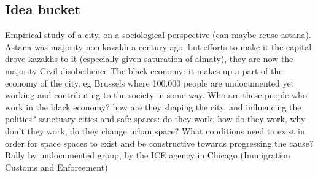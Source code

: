 \documentclass{article}
\begin{document}
\subsection{Idea bucket}

\begin{outline}
	\1 Empirical study of a city, on a sociological perspective (can maybe reuse astana). Astana was majority non-kazakh a century ago, but efforts to make it the capital drove kazakhs to it (especially given saturation of almaty), they are now the majority
	\1 Civil disobedience 
	\1 The black economy: it makes up a part of the economy of the city, eg Brussels where 100.000 people are undocumented yet working and contributing to the society in some way. Who are these people who work in the black economy? how are they shaping the city, and influencing the politics?
	\1 sanctuary cities and safe spaces: do they work, how do they work, why don't they work, do they change urban space?
		\2 What conditions need to exist in order for space spaces to exist and be constructive towards progressing the cause?
		\2 Rally by undocumented group, by the ICE agency in Chicago (Immigration Customs and Enforcement)
\end{outline}

\pagebreak 

\printbibliography


\begin{outline}
	\1
\end{outline}

\fi
\end{document}
